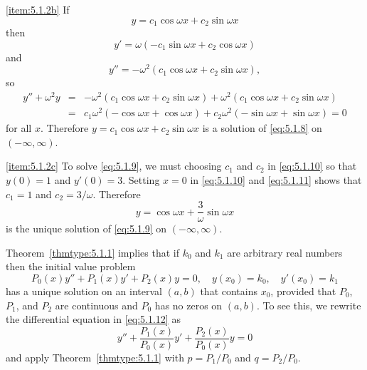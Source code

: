 \documentclass{ximera}
\begin{document}
\begin{example}
\begin{explanation}
\ref{item:5.1.2b} If
\begin{equation}\label{eq:5.1.10}
y=c_1\cos\omega x+c_2\sin\omega x
\end{equation}
 then
\begin{equation}\label{eq:5.1.11}
y'=\omega(-c_1\sin\omega x+c_2\cos\omega x)
\end{equation}
and
$$
y''=-\omega^2(c_1\cos\omega x+c_2\sin\omega x),
$$
so
\begin{eqnarray*}
y''+\omega^2y&=& -\omega^2(c_1\cos\omega x+c_2\sin\omega x)
+\omega^2(c_1\cos\omega x+c_2\sin\omega x)\\
&=&c_1\omega^2(-\cos\omega x+\cos\omega x)+
c_2\omega^2(-\sin\omega x+\sin\omega x)=0
\end{eqnarray*}
for all $x$. Therefore $y=c_1\cos\omega x+c_2\sin\omega x$ is a
solution of \eqref{eq:5.1.8} on $(-\infty,\infty)$.
 
\ref{item:5.1.2c}
To solve
\eqref{eq:5.1.9}, we must choosing $c_1$ and $c_2$ in \eqref{eq:5.1.10}
so that $y(0)=1$ and $y'(0)=3$. Setting $x=0$ in \eqref{eq:5.1.10}
and \eqref{eq:5.1.11} shows that $c_1=1$ and $c_2=3/\omega$.
Therefore
$$
y=\cos\omega x+\frac{3}{\omega}\sin\omega x
$$
 is the unique solution of \eqref{eq:5.1.9} on
$(-\infty,\infty)$.
\end{explanation}
\end{example}
 
Theorem~\ref{thmtype:5.1.1} implies that if $k_0$ and $k_1$ are
arbitrary real numbers then the initial value problem
\begin{equation}\label{eq:5.1.12}
P_0(x)y''+P_1(x)y'+P_2(x)y=0,\quad y(x_0)=k_0,\quad y'(x_0)=k_1
\end{equation}
has a unique solution on an interval $(a,b)$ that contains $x_0$,
provided that $P_0$, $P_1$, and $P_2$ are continuous and $P_0$
has no zeros on $(a,b)$. To see this, we rewrite the differential
equation in  \eqref{eq:5.1.12} as
$$
y''+\frac{P_1(x)}{P_0(x)}y'+\frac{P_2(x)}{P_0(x)}y=0
$$
and apply Theorem~\ref{thmtype:5.1.1} with $p=P_1/P_0$ and $q=P_2/P_0$.
 
\end{document}
